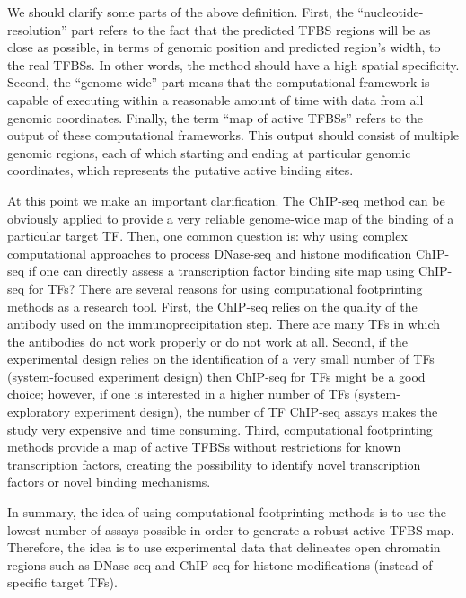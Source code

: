 We should clarify some parts of the above definition. First, the ``nucleotide-resolution'' part refers to the fact that the predicted TFBS regions will be as close as possible, in terms of genomic position and predicted region's width, to the real TFBSs. In other words, the method should have a high spatial specificity. Second, the ``genome-wide'' part means that the computational framework is capable of executing within a reasonable amount of time with data from all genomic coordinates. Finally, the term ``map of active TFBSs'' refers to the output of these computational frameworks. This output should consist of multiple genomic regions, each of which starting and ending at particular genomic coordinates, which represents the putative active binding sites.

At this point we make an important clarification. The ChIP-seq method can be obviously applied to provide a very reliable genome-wide map of the binding of a particular target TF. Then, one common question is: why using complex computational approaches to process DNase-seq and histone modification ChIP-seq if one can directly assess a transcription factor binding site map using ChIP-seq for TFs? There are several reasons for using computational footprinting methods as a research tool. First, the ChIP-seq relies on the quality of the antibody used on the immunoprecipitation step. There are many TFs in which the antibodies do not work properly or do not work at all. Second, if the experimental design relies on the identification of a very small number of TFs (system-focused experiment design) then ChIP-seq for TFs might be a good choice; however, if one is interested in a higher number of TFs (system-exploratory experiment design), the number of TF ChIP-seq assays makes the study very expensive and time consuming. Third, computational footprinting methods provide a map of active TFBSs without restrictions for known transcription factors, creating the possibility to identify novel transcription factors or novel binding mechanisms.

In summary, the idea of using computational footprinting methods is to use the lowest number of assays possible in order to generate a robust active TFBS map. Therefore, the idea is to use experimental data that delineates open chromatin regions such as DNase-seq and ChIP-seq for histone modifications (instead of specific target TFs).

